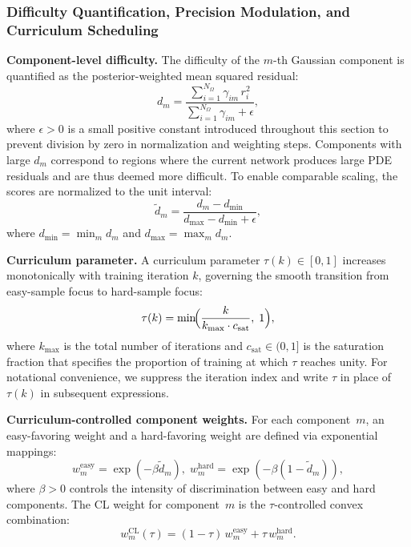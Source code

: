 \documentclass{article}
\theoremstyle{plain}
\theoremstyle{definition}
\theoremstyle{remark}
\begin{document}
	\subsubsection{Difficulty Quantification, Precision Modulation,
		and Curriculum Scheduling}
	
	\textbf{Component-level difficulty.}\;
	The difficulty of the $m$-th Gaussian component is quantified as the
	posterior-weighted mean squared residual:
	\begin{equation}
		d_m = \frac{\sum_{i=1}^{N_\Omega}\gamma_{im}\,r_i^2}
		{\sum_{i=1}^{N_\Omega}\gamma_{im}+\epsilon},
		\label{eq:component_difficulty}
	\end{equation}
	where $\epsilon>0$ is a small positive constant introduced
	throughout this section to prevent division by zero in normalization
	and weighting steps.
	Components with large $d_m$ correspond to regions where the current
	network produces large PDE residuals and are thus deemed more difficult.
	To enable comparable scaling, the scores are normalized to the unit
	interval:
	\begin{equation}
		\tilde{d}_m
		= \frac{d_m - d_{\min}}
		{d_{\max} - d_{\min} + \epsilon},
		\label{eq:difficulty_normalized}
	\end{equation}
	where $d_{\min}=\min_m d_m$ and $d_{\max}=\max_m d_m$.
	
	\textbf{Curriculum parameter.}\;
	A curriculum parameter $\tau(k)\in[0,1]$ increases monotonically with
	training iteration $k$, governing the smooth transition from easy-sample
	focus to hard-sample focus:
	\begin{equation}
		\tau(k)
		= \min\!\Bigl(\frac{k}{k_{\max}\cdot c_{\mathrm{sat}}},\;1\Bigr),
		\label{eq:tau}
	\end{equation}
	where $k_{\max}$ is the total number of iterations and
	$c_{\mathrm{sat}}\in(0,1]$ is the saturation fraction that
	specifies the proportion of training at which $\tau$ reaches unity.
	For notational convenience, we suppress the iteration index and write
	$\tau$ in place of $\tau(k)$ in subsequent expressions.
	
	\textbf{Curriculum-controlled component weights.}\;
	For each component~$m$, an easy-favoring weight and a hard-favoring
	weight are defined via exponential mappings:
	\begin{equation}
		w_m^{\mathrm{easy}} = \exp(-\beta\tilde{d}_m),\;
		w_m^{\mathrm{hard}} = \exp(-\beta(1 - \tilde{d}_m)),
		\label{eq:easy_hard_weights}
	\end{equation}
	where $\beta>0$ controls the intensity of discrimination between easy
	and hard components. The CL weight for component~$m$ is the
	$\tau$-controlled convex combination:
	\begin{equation}
		w_m^{\mathrm{CL}}(\tau)
		= (1-\tau)\,w_m^{\mathrm{easy}}
		+ \tau\,w_m^{\mathrm{hard}}.
		\label{eq:curriculum_weight}
	\end{equation}
	
\end{document}
